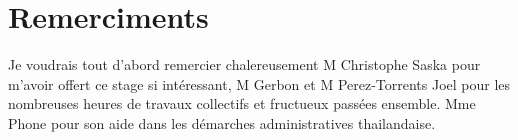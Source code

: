 \chapter{Remerciments}
Je voudrais tout d'abord remercier chalereusement M Christophe Saska pour m'avoir offert ce stage si intéressant, M Gerbon et M Perez-Torrents Joel pour les nombreuses heures de travaux collectifs et fructueux passées ensemble. Mme Phone pour son aide dans les démarches administratives thailandaise.
